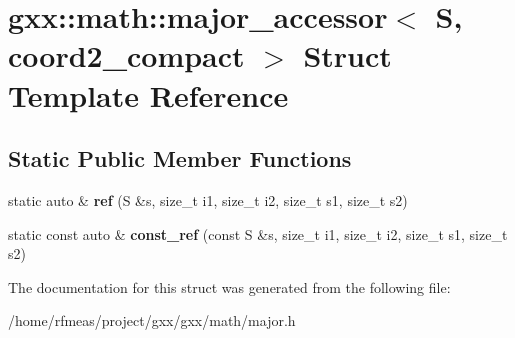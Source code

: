 \hypertarget{structgxx_1_1math_1_1major__accessor_3_01S_00_01coord2__compact_01_4}{}\section{gxx\+:\+:math\+:\+:major\+\_\+accessor$<$ S, coord2\+\_\+compact $>$ Struct Template Reference}
\label{structgxx_1_1math_1_1major__accessor_3_01S_00_01coord2__compact_01_4}
\subsection*{Static Public Member Functions}
\begin{DoxyCompactItemize}
\item 
static auto \& {\bfseries ref} (S \&s, size\+\_\+t i1, size\+\_\+t i2, size\+\_\+t s1, size\+\_\+t s2)\hypertarget{structgxx_1_1math_1_1major__accessor_3_01S_00_01coord2__compact_01_4_af74aa66cf30fe6c44b810bfe9d0c3c12}{}\label{structgxx_1_1math_1_1major__accessor_3_01S_00_01coord2__compact_01_4_af74aa66cf30fe6c44b810bfe9d0c3c12}

\item 
static const auto \& {\bfseries const\+\_\+ref} (const S \&s, size\+\_\+t i1, size\+\_\+t i2, size\+\_\+t s1, size\+\_\+t s2)\hypertarget{structgxx_1_1math_1_1major__accessor_3_01S_00_01coord2__compact_01_4_a56eb508ed3a5b49bf65a0db26dd6b6f9}{}\label{structgxx_1_1math_1_1major__accessor_3_01S_00_01coord2__compact_01_4_a56eb508ed3a5b49bf65a0db26dd6b6f9}

\end{DoxyCompactItemize}


The documentation for this struct was generated from the following file\+:\begin{DoxyCompactItemize}
\item 
/home/rfmeas/project/gxx/gxx/math/major.\+h\end{DoxyCompactItemize}
